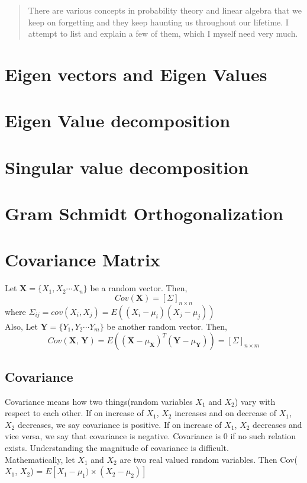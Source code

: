 \begin{abstract}
There are various concepts in probability theory and linear algebra that we keep on forgetting and they keep haunting us throughout our lifetime. I attempt to list and explain a few of them, which I myself need very much. 
\end{abstract}

\section{Eigen vectors and Eigen Values}
\section{Eigen Value decomposition}
\section{Singular value decomposition}
\section{Gram Schmidt Orthogonalization}
\section{Covariance Matrix}
Let $\textbf{X} = \{X_1, X_2 \cdots X_n\}$ be a random vector. Then, 
\begin{equation}
Cov(\textbf{X}) = [\Sigma]_{n \times n} 
\end{equation}
where $\Sigma_{ij} = cov(X_i, X_j) = E((X_i - \mu_i)(X_j - \mu_j))$
\\
Also, Let $\textbf{Y} = \{Y_1, Y_2 \cdots Y_m\}$ be another random vector. Then, 
\begin{equation}
Cov(\textbf{X, Y}) = E({(\textbf{X} - \mu_\textbf{X})}^T(\textbf{Y} - \mu_\textbf{Y})) = [\Sigma]_{n \times m}
\end{equation}

\subsection{Covariance}
Covariance means how two things(random variables $X_1$ and $X_2$) vary with respect to each other. If on increase of $X_1$, $X_2$ increases and on decrease of $X_1$, $X_2$ decreases, we say covariance is positive. If on increase of $X_1$, $X_2$ decreases and vice versa, we say that covariance is negative. Covariance is 0 if no such relation exists. Understanding the magnitude of covariance is difficult. 
\\
Mathematically, let $X_1$ and $X_2$ are two real valued random variables. Then Cov($X_1$, $X_2$) = $E[X_1 - \mu_1)\times(X_2-\mu_2)]$
